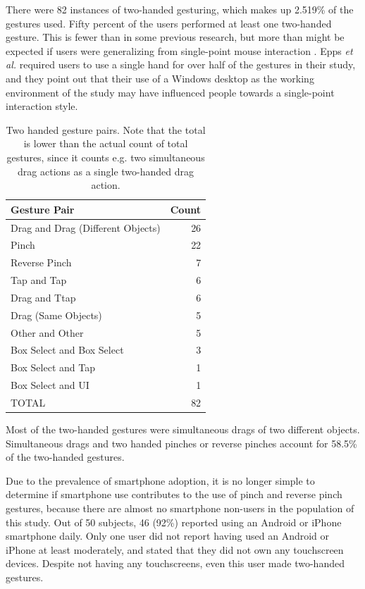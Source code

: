 There were 82 instances of two-handed gesturing, which makes up 2.519\% of the gestures used.
Fifty percent of the users performed at least one two-handed gesture. 
This is fewer than in some previous research, but more than might be expected if users were generalizing from single-point mouse interaction \citep{micire2010multi, epps2006study}.
Epps \emph{et al.} required users to use a single hand for over half of the gestures in their study, and they point out that their use of a Windows desktop as the working environment of the study may have influenced people towards a single-point interaction style. 



\begin{table}
	\centering
	\begin{tabular}{l r}
		Gesture Pair & Count\\
		\hline
		Drag and Drag (Different Objects) & 26 \\
		Pinch & 22\\
		Reverse Pinch & 7\\
		Tap and Tap & 6\\
		Drag and Ttap & 6\\
		Drag (Same Objects) & 5\\
		Other and Other & 5\\		
		Box Select and Box Select & 3\\
		Box Select and Tap & 1\\
		Box Select and UI & 1\\
		\hline
		TOTAL & 82\\
	\end{tabular}
	\caption{Two handed gesture pairs. Note that the total is lower than the actual count of total gestures, since it counts e.g. two simultaneous drag actions as a single two-handed drag action.}
\end{table}

Most of the two-handed gestures were simultaneous drags of two different objects. 
Simultaneous drags and two handed pinches or reverse pinches account for 58.5\% of the two-handed gestures.  

Due to the prevalence of smartphone adoption, it is no longer simple to determine if smartphone use contributes to the use of pinch and reverse pinch gestures, because there are almost no smartphone non-users in the population of this study. 
Out of 50 subjects, 46 (92\%) reported using an Android or iPhone smartphone daily. 
Only one user did not report having used an Android or iPhone at least moderately, and stated that they did not own any touchscreen devices. 
Despite not having any touchscreens, even this user made two-handed gestures. 

